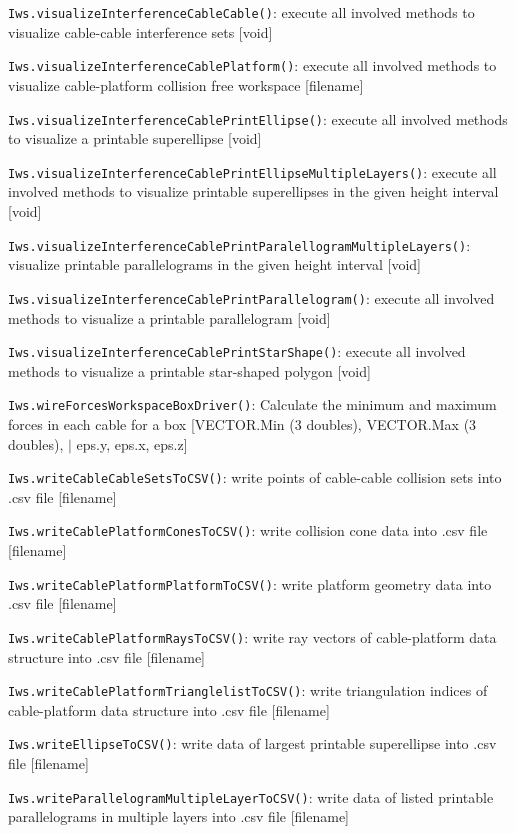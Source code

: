 \documentclass[11pt,a4paper,onepage,openany]{book}
\begin{document}
\texttt{Iws.visualizeInterferenceCableCable()}: execute all involved methods to visualize cable-cable interference sets [void]

\texttt{Iws.visualizeInterferenceCablePlatform()}: execute all involved methods to visualize cable-platform collision free workspace [filename]

\texttt{Iws.visualizeInterferenceCablePrintEllipse()}: execute all involved methods to visualize a printable superellipse [void]

\texttt{Iws.visualizeInterferenceCablePrintEllipseMultipleLayers()}: execute all involved methods to visualize printable superellipses in the given height interval [void]

\texttt{Iws.visualizeInterferenceCablePrintParalellogramMultipleLayers()}: visualize printable parallelograms in the given height interval [void]

\texttt{Iws.visualizeInterferenceCablePrintParallelogram()}: execute all involved methods to visualize a printable parallelogram [void]

\texttt{Iws.visualizeInterferenceCablePrintStarShape()}: execute all involved methods to visualize a printable star-shaped polygon [void]

\texttt{Iws.wireForcesWorkspaceBoxDriver()}: Calculate the minimum and maximum forces in each cable for a box [VECTOR.Min (3 doubles), VECTOR.Max (3 doubles), $|$ eps.y, eps.x, eps.z]

\texttt{Iws.writeCableCableSetsToCSV()}: write points of cable-cable collision sets into .csv file [filename]

\texttt{Iws.writeCablePlatformConesToCSV()}: write collision cone data into .csv file [filename]

\texttt{Iws.writeCablePlatformPlatformToCSV()}: write platform geometry data into .csv file [filename]

\texttt{Iws.writeCablePlatformRaysToCSV()}: write ray vectors of cable-platform data structure into .csv file [filename]

\texttt{Iws.writeCablePlatformTrianglelistToCSV()}: write triangulation indices of cable-platform data structure into .csv file [filename]

\texttt{Iws.writeEllipseToCSV()}: write data of largest printable superellipse into .csv file [filename]

\texttt{Iws.writeParallelogramMultipleLayerToCSV()}: write data of listed printable parallelograms in multiple layers into .csv file [filename]
\end{document}
